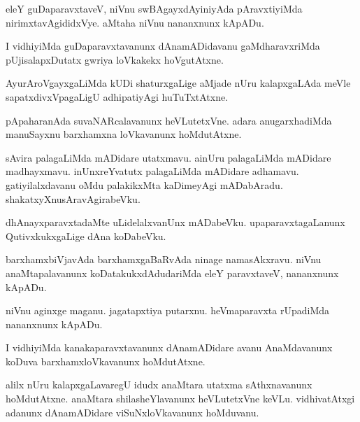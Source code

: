 \documentclass{article}
\begin{document}
\begin{mn}
eleY  guDaparavxtaveV,  niVnu  swBAgayxdAyiniyAda  pAravxtiyiMda  nirimxtavAgididxVye.  
aMtaha  niVnu  nananxnunx  kApADu.
\end{mn}

\begin{mn}
I  vidhiyiMda  guDaparavxtavanunx  dAnamADidavanu  gaMdharavxriMda  pUjisalapxDutatx  
gwriya  loVkakekx  hoVgutAtxne.
\end{mn}

\begin{mn}
AyurAroVgayxgaLiMda  kUDi  shaturxgaLige  aMjade  nUru  kalapxgaLAda  meVle  
sapatxdivxVpagaLigU  adhipatiyAgi  huTuTxtAtxne.
\end{mn}

\begin{mn}
pApaharanAda  suvaNARcalavanunx  heVLutetxVne.  adara  anugarxhadiMda  manuSayxnu  
barxhamxna  loVkavanunx  hoMdutAtxne.
\end{mn}

\begin{mn}
sAvira  palagaLiMda  mADidare  utatxmavu.  ainUru  palagaLiMda  mADidare  madhayxmavu.  
inUnxreYvatutx  palagaLiMda  mADidare  adhamavu.  gatiyilalxdavanu  oMdu  palakikxMta  
kaDimeyAgi  mADabAradu.  shakatxyXnusAravAgirabeVku.
\end{mn}

\begin{mn}
dhAnayxparavxtadaMte  uLidelalxvanUnx  mADabeVku.  upaparavxtagaLanunx  QutivxkukxgaLige  
dAna  koDabeVku.
\end{mn}

\begin{mn}
barxhamxbiVjavAda  barxhamxgaBaRvAda  ninage  namasAkxravu.  niVnu  anaMtapalavanunx  
koDatakukxdAdudariMda  eleY  paravxtaveV,  nananxnunx  kApADu.
\end{mn}

\begin{mn}
niVnu  aginxge  maganu.  jagatapxtiya  putarxnu.  heVmaparavxta  rUpadiMda  nananxnunx  kApADu.
\end{mn}

\begin{mn}
I  vidhiyiMda  kanakaparavxtavanunx  dAnamADidare  avanu  AnaMdavanunx  koDuva  barxhamxloVkavanunx  hoMdutAtxne.
\end{mn}

\begin{mn}
alilx  nUru  kalapxgaLavaregU  idudx  anaMtara  utatxma sAthxnavanunx  hoMdutAtxne.  anaMtara  
shilasheYlavanunx  heVLutetxVne  keVLu.  vidhivatAtxgi  adanunx  dAnamADidare  viSuNxloVkavanunx  hoMduvanu.
\end{mn}
\end{document}
